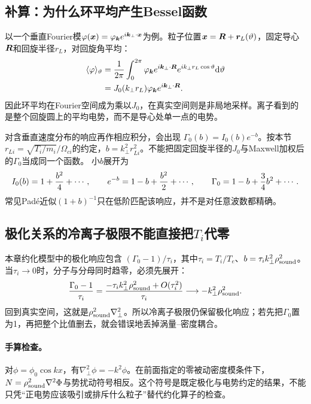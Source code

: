 \documentclass[UTF8,a4paper,11pt,openany,fontset=fandol]{ctexbook}
\begin{document}
\subsection{补算：为什么环平均产生Bessel函数}
以一个垂直Fourier模$\varphi(\bm{x})=\varphi_{\bm{k}}e^{i\bm{k}_\perp\cdot\bm{x}}$为例。粒子位置$\bm{x}=\bm{R}+\bm{r}_L(\vartheta)$，固定导心$\bm{R}$和回旋半径$r_L$，对回旋角平均：
\begin{align}
 \langle\varphi\rangle_\vartheta
 &={1\over2\pi}\int_0^{2\pi}
 \varphi_{\bm{k}}e^{i\bm{k}_\perp\cdot\bm{R}}
 e^{ik_\perp r_L\cos\vartheta}\mathrm d\vartheta\\
 &=J_0(k_\perp r_L)\varphi_{\bm{k}}e^{i\bm{k}_\perp\cdot\bm{R}}.
\end{align}
因此环平均在Fourier空间成为乘以$J_0$，在真实空间则是非局地采样。离子看到的是整个回旋圆上的平均电势，而不是导心处单一点的电势。

对含垂直速度分布的响应再作相应积分，会出现
$\Gamma_0(b)=I_0(b)e^{-b}$。按本节$r_{Li}=\sqrt{T_i/m_i}/\Omega_{ci}$的约定，$b=k_\perp^2r_{Li}^2$。不能把固定回旋半径的$J_0$与Maxwell加权后的$\Gamma_0$当成同一个函数。
小$b$展开为
\begin{equation}
 I_0(b)=1+{b^2\over4}+\cdots,\qquad
 e^{-b}=1-b+{b^2\over2}+\cdots,\qquad
 \Gamma_0=1-b+{3\over4}b^2+\cdots.
\end{equation}
常见Padé近似$(1+b)^{-1}$只在低阶匹配该响应，并不是对任意波数都精确。

\subsection{极化关系的冷离子极限不能直接把$T_i$代零}
本章约化模型中的极化响应包含
$ (\Gamma_0-1)/\tau_i$，其中$\tau_i=T_i/T_e$、$b=\tau_i k_\perp^2\rho_{\rm sound}^2$。当$\tau_i\to0$时，分子与分母同时趋零，必须先展开：
\begin{equation}
 {\Gamma_0-1\over\tau_i}
 ={ -\tau_i k_\perp^2\rho_{\rm sound}^2+O(\tau_i^2)\over\tau_i}
 \longrightarrow-k_\perp^2\rho_{\rm sound}^2.
\end{equation}
回到真实空间，这就是$\rho_{\rm sound}^2\nabla_\perp^2$。所以冷离子极限仍保留极化响应；若先把$\Gamma_0$置为1，再把整个比值删去，就会错误地丢掉涡量--密度耦合。

\paragraph{手算检查。}
对$\phi=\phi_0\cos kx$，有$\nabla_\perp^2\phi=-k^2\phi$。在前面指定的零被动密度模条件下，$N=\rho_{\rm sound}^2\nabla^2\Phi$与势扰动符号相反。这个符号是既定极化与电势约定的结果，不能只凭“正电势应该吸引或排斥什么粒子”替代约化算子的检查。
\end{document}
